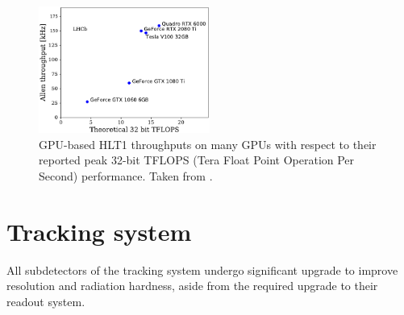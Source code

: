 \begin{figure}[!htb]
    \centering
    \includegraphics[width=0.5\textwidth]{./figs-lhcb-upgrade-overview/trigger/allen_perf_vs_tflop.pdf}
    \caption{
        GPU-based HLT1 throughputs on many GPUs with respect to their reported
        peak 32-bit TFLOPS (Tera Float Point Operation Per Second) performance.
        Taken from \cite{LHCB-FIGURE-2020-014}.
    }
    \label{fig:allen-gpu-throughput}
\end{figure}


\section{Tracking system}
\label{ref:lhcb-upgrade-overview:tracking}

All subdetectors of the tracking system undergo significant upgrade to improve
resolution and radiation hardness, aside from the required upgrade to their
readout system.

